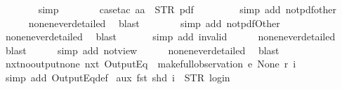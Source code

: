 \begin{isabellebody}
\ \ \ \ \ \ \isamarkupfalse%
\ simp\isanewline
\ \ \ \ \ \ \isamarkupfalse%
\ {\isacharparenleft}case{\isacharunderscore}tac\ {\isachardoublequoteopen}aa\ {\isacharequal}\ STR\ {\isacharprime}{\isacharprime}pdf{\isacharprime}{\isacharprime}{\isachardoublequoteclose}{\isacharparenright}\isanewline
\ \ \ \ \ \ \ \isamarkupfalse%
\ {\isacharparenleft}simp\ add{\isacharcolon}\ not{\isacharunderscore}pdf{\isacharunderscore}other{\isacharparenright}\isanewline
\ \ \ \ \isamarkupfalse%
\ none{\isacharunderscore}never{\isacharunderscore}detailed\ \isamarkupfalse%
\ blast\isanewline
\ \ \ \ \ \ \isamarkupfalse%
\ {\isacharparenleft}simp\ add{\isacharcolon}\ not{\isacharunderscore}pdfOther{\isacharunderscore}{}{\isacharparenright}\isanewline
\ \ \ \ \isamarkupfalse%
\ none{\isacharunderscore}never{\isacharunderscore}detailed\ \isamarkupfalse%
\ blast\isanewline
\isanewline
\ \ \ \ \ \isamarkupfalse%
\ {\isacharparenleft}simp\ add{\isacharcolon}\ invalid{\isacharparenright}\isanewline
\ \ \ \ \isamarkupfalse%
\ none{\isacharunderscore}never{\isacharunderscore}detailed\ \isamarkupfalse%
\ blast\isanewline
\isanewline
\ \ \ \ \isamarkupfalse%
\ {\isacharparenleft}simp\ add{\isacharcolon}\ not{\isacharunderscore}view{\isacharparenright}\isanewline
\ \ \ \ \isamarkupfalse%
\ none{\isacharunderscore}never{\isacharunderscore}detailed\ \isamarkupfalse%
\ blast\isanewline
{}\isamarkupfalse%
%
\endisatagproof
{\isafoldproof}%
%
\isadelimproof
\isanewline
%
\endisadelimproof
\isanewline
{}\isamarkupfalse%
\ nxt{\isacharunderscore}no{\isacharunderscore}output{\isacharunderscore}none{\isacharcolon}\ {\isachardoublequoteopen}{\isacharparenleft}nxt\ {\isacharparenleft}OutputEq\ {\isacharbrackleft}{\isacharbrackright}{\isacharparenright}{\isacharparenright}\ {\isacharparenleft}make{\isacharunderscore}full{\isacharunderscore}observation\ e\ None\ r\ i{\isacharparenright}{\isachardoublequoteclose}\isanewline
%
\isadelimproof
\ \ %
\endisadelimproof
%
\isatagproof
{}\isamarkupfalse%
\ {\isacharparenleft}simp\ add{\isacharcolon}\ OutputEq{\isacharunderscore}def{\isacharparenright}%
\endisatagproof
{\isafoldproof}%
%
\isadelimproof
\isanewline
%
\endisadelimproof
\isanewline
{}\isamarkupfalse%
\ aux{}{\isacharcolon}\ {\isachardoublequoteopen}fst\ {\isacharparenleft}shd\ i{\isacharparenright}\ {\isacharequal}\ STR\ {\isacharprime}{\isacharprime}login{\isacharprime}{\isacharprime}\ {\isasymLongrightarrow}\isanewline

\end{isabellebody}
